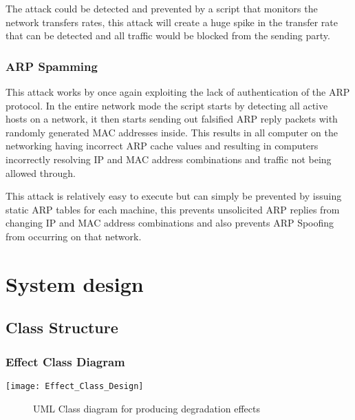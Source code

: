 The attack could be detected and prevented by a script that monitors the network transfers rates, this attack will create a huge spike in the transfer rate that can be detected and all traffic would be blocked from the sending party.

\subsubsection{ARP Spamming}
This attack works by once again exploiting the lack of authentication of the ARP protocol. In the entire network mode the script starts by detecting all active hosts on a network, it then starts sending out falsified ARP reply packets with randomly generated MAC addresses inside. This results in all computer on the networking having incorrect ARP cache values and resulting in computers incorrectly resolving IP and MAC address combinations and traffic not being allowed through.

This attack is relatively easy to execute but can simply be prevented by issuing static ARP tables for each machine, this prevents unsolicited ARP replies from changing IP and MAC address combinations and also prevents ARP Spoofing from occurring on that network.

\section{System design}

\subsection{Class Structure}
\subsubsection{Effect Class Diagram}

\begin{center}
	\texttt{[image: Effect\_Class\_Design]}
	\begin{figure}[h]
		\caption{UML Class diagram for producing degradation effects}
	\end{figure}
\end{center}

